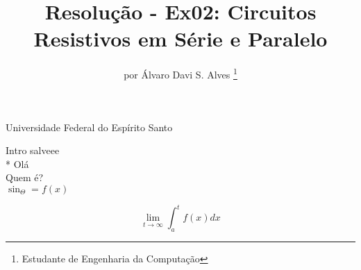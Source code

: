 \documentclass[a4paper]{article}
\title{Resolução - Ex02: Circuitos Resistivos em Série e Paralelo}
\author{por Álvaro Davi S. Alves
	\thanks{Estudante de Engenharia da Computação}
}
\begin{document}
	\maketitle
	Universidade Federal do Espírito Santo

	\newpage
	Intro salveee \\*
	Olá \\
	Quem é? \\

	$\sin_\Theta = f(x)$

	\begin{equation}
		\lim_{t \rightarrow \infty}
		\int_{a}^{t} f(x) dx
	\end{equation}
\end{document}
